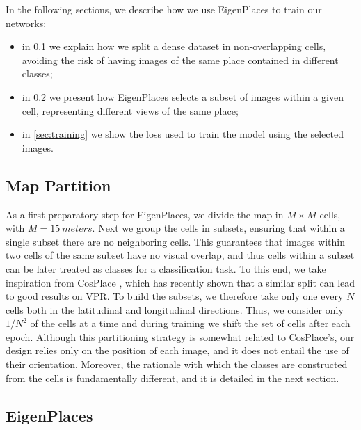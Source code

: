 \documentclass[10pt,twocolumn,letterpaper]{article}
\newcommand\our{EigenPlaces}
\begin{document}
In the following sections, we describe how we use EigenPlaces to train our networks:
\begin{itemize}[noitemsep,topsep=1pt]
    \item in \cref{sec:dataset_partitioning} we explain how we split a dense dataset in non-overlapping cells, avoiding the risk of having images of the same place contained in different classes;
    \item in \cref{sec:eigenplaces} we present how EigenPlaces selects a subset of images within a given cell, representing different views of the same place;
    \item in \cref{sec:training} we show the loss used to train the model using the selected images.
\end{itemize}




\subsection{Map Partition}
\label{sec:dataset_partitioning}
As a first preparatory step for {\our}, we divide the map in $M \times M$ cells, with $M = 15 ~meters$.
Next we group the cells in subsets, ensuring that within a single subset there are no neighboring cells. This guarantees that images within two cells of the same subset have no visual overlap, and thus cells within a subset can be later treated as classes for a classification task.
To this end, we take inspiration from CosPlace \cite{Berton_2022_cosPlace}, which has recently shown that a similar split can lead to good results on VPR.
To build the subsets, we therefore take only one every $N$ cells both in the latitudinal and longitudinal directions.
Thus, we consider only $1/N^2$ of the cells at a time and during training we shift the set of cells after each epoch.
Although this partitioning strategy is somewhat related to CosPlace's, our design relies only on the position of each image, and it does not entail the use of their orientation. Moreover, the rationale with which the classes are constructed from the cells is fundamentally different, and it is detailed in the next section.



\subsection{EigenPlaces}
\label{sec:eigenplaces}
\end{document}
